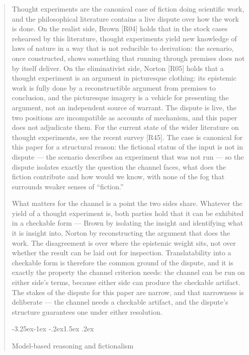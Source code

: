 \documentclass[11pt,a4paper]{article}
\makeatletter
\renewcommand\subsection{\@startsection{subsection}{2}{\z@}%
  {-3.25ex\@plus -1ex \@minus -.2ex}{1.5ex \@plus .2ex}%
  {\normalfont\large\bfseries\raggedright}}
\makeatother
\begin{document}
\begin{abstract}
Thought experiments are the canonical case of fiction doing scientific work, and the philosophical literature contains a live dispute over how the work is done. On the realist side, Brown [R04] holds that in the stock cases rehearsed by this literature, thought experiments yield new knowledge of laws of nature in a way that is not reducible to derivation: the scenario, once constructed, shows something that running through premises does not by itself deliver. On the eliminativist side, Norton [R05] holds that a thought experiment is an argument in picturesque clothing: its epistemic work is fully done by a reconstructible argument from premises to conclusion, and the picturesque imagery is a vehicle for presenting the argument, not an independent source of warrant. The dispute is live, the two positions are incompatible as accounts of mechanism, and this paper does not adjudicate them. For the current state of the wider literature on thought experiments, see the recent survey [R45]. The case is canonical for this paper for a structural reason: the fictional status of the input is not in dispute — the scenario describes an experiment that was not run — so the dispute isolates exactly the question the channel faces, what does the fiction contribute and how would we know, with none of the fog that surrounds weaker senses of ``fiction.''

What matters for the channel is a point the two sides share. Whatever the yield of a thought experiment is, both parties hold that it can be exhibited in a checkable form — Brown by isolating the insight and identifying what it is insight into, Norton by reconstructing the argument that does the work. The disagreement is over where the epistemic weight sits, not over whether the result can be laid out for inspection. Translatability into a checkable form is therefore the common ground of the dispute, and it is exactly the property the channel criterion needs: the channel can be run on either side's terms, because either side can produce the checkable artifact. The stakes of the dispute for this paper are narrow, and that narrowness is deliberate — the channel needs a checkable artifact, and the dispute's structure guarantees one under either resolution.

\subsection{Model-based reasoning and fictionalism}


\end{abstract}
\end{document}

